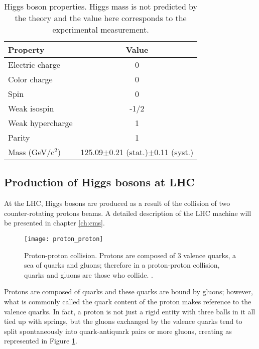 \begin{table}[h]
\centering
\scriptsize
\begin{tabular}{lc}\hline
Property         & Value  \\ \hline
Electric charge  & 0      \\
Color charge    & 0      \\
Spin             & 0      \\
Weak isospin     & -1/2    \\
Weak hypercharge & 1      \\
Parity           & 1      \\\hline
Mass (GeV/c$^2$) & 125.09$\pm$0.21 (stat.)$\pm$0.11 (syst.)\\\hline
\end{tabular}
\caption[Higgs boson properties.]{Higgs boson properties. Higgs mass is not predicted by the theory and the value here corresponds to the experimental measurement.}\label{higgs_prop}
\end{table}


\subsection{Production of Higgs bosons at LHC}

At the LHC, Higgs bosons are produced as a result of the collision of two counter-rotating protons beams. A detailed description of the LHC machine will be presented in chapter \ref{ch:cms}.%
\begin{figure}[!h]
\centering
\texttt{[image: proton\_proton]}
\caption[Proton-Proton collision]{Proton-proton collision. Protons are composed of 3 valence quarks, a sea of quarks and gluons; therefore in a proton-proton collision, quarks and gluons are those who collide. \cite{pp_coll}.}
\label{pp_collision}
\end{figure}

Protons are composed of quarks and these quarks are bound by gluons; however, what is commonly called the quark content of the proton makes reference to the valence quarks. In fact, a proton is not just a rigid entity with three balls in it all tied up with springs, but the gluons exchanged by the valence quarks tend to split spontaneously into quark-antiquark pairs or more gluons, creating  as represented in Figure \ref{pp_collision}.

